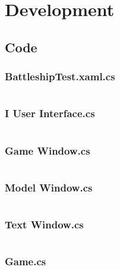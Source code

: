 \chapter{Development}
\section{Code}

	\subsection{BattleshipTest.xaml.cs}
	\inputminted[linenos=true,fontsize=\footnotesize,tabsize=2]{csharp}{../Battleship/Battleship/BattleshipTest.xaml.cs}
	
	\newpage
	
	\subsection{I User Interface.cs}
	\inputminted[linenos=true,fontsize=\footnotesize,tabsize=2]{csharp}{../Battleship/Battleship/I_User_Interface.cs}
	
	\newpage
	
	\subsection{Game Window.cs}
	\inputminted[linenos=true,fontsize=\footnotesize,tabsize=2]{csharp}{../Battleship/Battleship/Game_Window.cs}
	
	\newpage
	
	\subsection{Model Window.cs}
	\inputminted[linenos=true,fontsize=\footnotesize,tabsize=2]{csharp}{../Battleship/Battleship/Model_Window.cs}
	
	\newpage
	
	\subsection{Text Window.cs}
	\inputminted[linenos=true,fontsize=\footnotesize,tabsize=2]{csharp}{../Battleship/Battleship/Text_Window.cs}
	
	\newpage
	
	\subsection{Game.cs}
	\inputminted[linenos=true,fontsize=\footnotesize,tabsize=2]{csharp}{../Battleship/Battleship/Game.cs}
	
